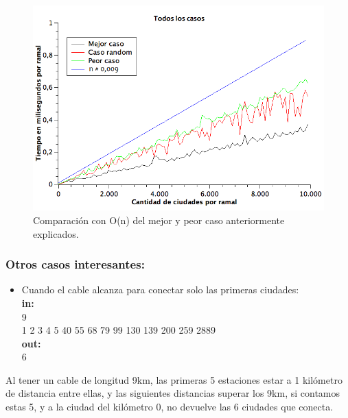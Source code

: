 \begin{figure}[H]
\begin{center}

  \includegraphics[width=\linewidth]{../graficos/ej1/TodosLosCasos.png}
  \caption{{\small Comparación con O(n) del mejor y peor caso anteriormente explicados. }} \label{ej1-tiempo-vs-cant-ciudadades-mejor-peor-caso}
\endminipage

\end{center}
\end{figure}


\subsubsection{Otros casos interesantes:}
\begin{itemize}
\item Cuando el cable alcanza para conectar solo las primeras ciudades:\\
\textbf{in:}\\
9\\
1 2 3 4 5 40 55 68 79 99 130 139 200 259 2889\\
\textbf{out:}\\
6\\

\end{itemize}

Al tener un cable de longitud 9km, las primeras 5 estaciones estar a 1 kilómetro de distancia entre ellas, y las siguientes distancias superar los 9km, si contamos estas 5, y a la ciudad del kilómetro 0, no devuelve las 6 ciudades que conecta.\\

